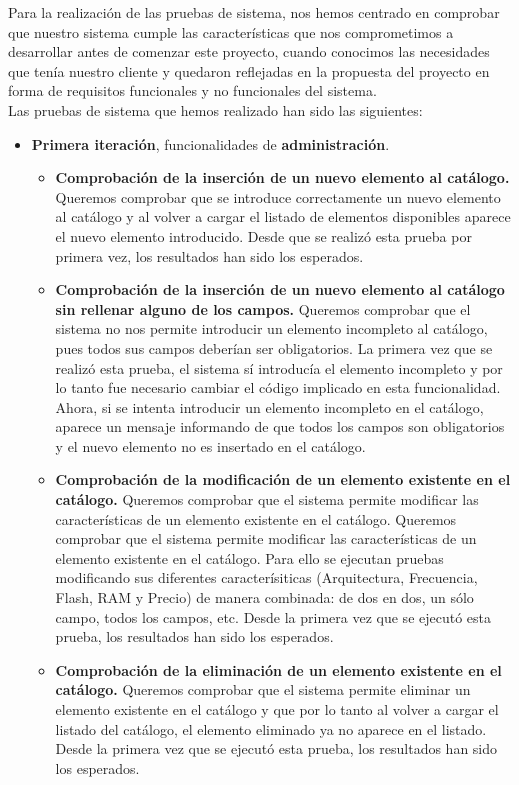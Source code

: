 Para la realización de las pruebas de sistema, nos hemos centrado en comprobar que nuestro sistema cumple las características que nos comprometimos a desarrollar antes de comenzar este proyecto, cuando conocimos las necesidades que tenía nuestro cliente y quedaron reflejadas en la propuesta del proyecto en forma de requisitos funcionales y no funcionales del sistema.
\\[6pt]
Las pruebas de sistema que hemos realizado han sido las siguientes:
\begin{itemize}
\item \vspace{0.1in} \textbf{Primera iteración}, funcionalidades de \textbf{administración}.
	\begin{itemize}
	\item \textbf{Comprobación de la inserción de un nuevo elemento al catálogo.} Queremos comprobar que se introduce 				correctamente un nuevo elemento al catálogo y al volver a cargar el listado de elementos disponibles aparece el nuevo elemento introducido. Desde que se realizó esta prueba por primera vez, los resultados han sido los esperados.
	
	\item \textbf{Comprobación de la inserción de un nuevo elemento al catálogo sin rellenar alguno de los campos.} Queremos comprobar que el sistema no nos permite introducir un elemento incompleto al catálogo, pues todos sus campos deberían ser obligatorios. La primera vez que se realizó esta prueba, el sistema sí introducía el elemento incompleto y por lo tanto fue necesario cambiar el código implicado en esta funcionalidad. Ahora, si se intenta introducir un elemento incompleto en el catálogo, aparece un mensaje informando de que todos los campos son obligatorios y el nuevo elemento no es insertado en el catálogo.	
	
	\item \textbf{Comprobación de la modificación de un elemento existente en el catálogo.} Queremos comprobar que el sistema permite modificar las características de un elemento existente en el catálogo. Queremos comprobar que el sistema permite modificar las características de un elemento existente en el catálogo. Para ello se ejecutan pruebas modificando sus diferentes caracterísiticas (Arquitectura, Frecuencia, Flash, RAM y Precio) de manera combinada: de dos en dos, un sólo campo, todos los campos, etc. Desde la primera vez que se ejecutó esta prueba, los resultados han sido los esperados.
	
	\item \textbf{Comprobación de la eliminación de un elemento existente en el catálogo.} Queremos comprobar que el sistema permite eliminar un elemento existente en el catálogo y que por lo tanto al volver a cargar el listado del catálogo, el elemento eliminado ya no aparece en el listado. Desde la primera vez que se ejecutó esta prueba, los resultados han sido los esperados.


\end{itemize}
\end{itemize}
